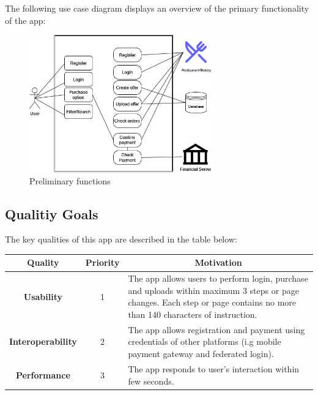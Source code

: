 \newpage
The following \gls{use case diagram} displays an overview of the primary functionality of the app:

\begin{figure}[H]
    \centering
    \includegraphics[width=0.7\textwidth]{assets/preliminary_use_case.png}
    \caption{Preliminary functions}
    \label{fig:preliminary_use_case}
\end{figure}

\subsection{Qualitiy Goals}

The key qualities of this app are described in the table below:

\begin{table}[H]
    \begin{tabularx}{\textwidth}{|c|c|X|}
        \toprule
        \multicolumn{1}{c}{Quality} & \multicolumn{1}{c}{Priority} & \multicolumn{1}{c}{Motivation} \\
        \midrule
        \textbf{Usability} & 1 & The app allows users to perform login, purchase and uploads within maximum 3 
        steps or page changes. Each step or page contains no more than 140 characters of instruction. \\
        \textbf{Interoperability} & 2 & The app allows registration and payment using credentials of other platforms
        (i.g \gls{mobile payment gateway} and \gls{federated login}). \\
        \textbf{Performance} & 3 & The app responds to user's interaction within few seconds. \\
        \bottomrule
    \end{tabularx}
\end{table}

